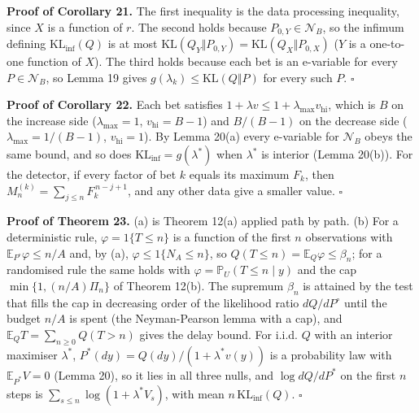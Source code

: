 \documentclass[
]{article}
\begin{document}
\textbf{Proof of Corollary 21.} The first inequality is the data
processing inequality, since \(X\) is a function of \(r\). The second
holds because \(P_{0,Y} \in \mathcal{N}_B\), so the infimum defining
\(\mathrm{KL}_{\inf}(Q)\) is at most
\(\mathrm{KL}(Q_Y \Vert P_{0,Y}) = \mathrm{KL}(Q_X \Vert P_{0,X})\)
(\(Y\) is a one-to-one function of \(X\)). The third holds because each
bet is an e-variable for every \(P \in \mathcal{N}_B\), so Lemma 19
gives \(g(\lambda_k) \le \mathrm{KL}(Q \Vert P)\) for every such \(P\).
\(\square\)

\textbf{Proof of Corollary 22.} Each bet satisfies
\(1 + \lambda v \le 1 + \lambda_{\max}v_{\mathrm{hi}}\), which is \(B\)
on the increase side (\(\lambda_{\max} = 1\),
\(v_{\mathrm{hi}} = B - 1\)) and \(B/(B-1)\) on the decrease side
(\(\lambda_{\max} = 1/(B-1)\), \(v_{\mathrm{hi}} = 1\)). By Lemma 20(a)
every e-variable for \(\mathcal{N}_B\) obeys the same bound, and so does
\(\mathrm{KL}_{\inf} = g(\lambda^\ast)\) when \(\lambda^\ast\) is
interior (Lemma 20(b)). For the detector, if every factor of bet \(k\)
equals its maximum \(F_k\), then
\(M_n^{(k)} = \sum_{j \le n} F_k^{\,n-j+1}\), and any other data give a
smaller value. \(\square\)

\textbf{Proof of Theorem 23.} (a) is Theorem 12(a) applied path by path.
(b) For a deterministic rule, \(\varphi = 1\lbrace T \le n\rbrace\) is a
function of the first \(n\) observations with
\(\mathbb{E}_{P^\circ}\varphi \le n/A\) and, by (a),
\(\varphi \le 1\lbrace N_A \le n\rbrace\), so
\(Q(T \le n) = \mathbb{E}_Q\varphi \le \beta_n\); for a randomised rule
the same holds with \(\varphi = \mathbb{P}_U(T \le n \mid y)\) and the
cap \(\min\lbrace 1, (n/A)\Pi_n\rbrace\) of Theorem 12(b). The supremum
\(\beta_n\) is attained by the test that fills the cap in decreasing
order of the likelihood ratio \(dQ/dP^\circ\) until the budget \(n/A\)
is spent (the Neyman-Pearson lemma with a cap), and
\(\mathbb{E}_Q T = \sum_{n \ge 0} Q(T > n)\) gives the delay bound. For
i.i.d. \(Q\) with an interior maximiser \(\lambda^\ast\),
\(P^\ast(dy) = Q(dy)/(1 + \lambda^\ast v(y))\) is a probability law with
\(\mathbb{E}_{P^\ast}V = 0\) (Lemma 20), so it lies in all three nulls,
and \(\log dQ/dP^\ast\) on the first \(n\) steps is
\(\sum_{s \le n}\log(1 + \lambda^\ast V_s)\), with mean
\(n\,\mathrm{KL}_{\inf}(Q)\). \(\square\)
\end{document}
